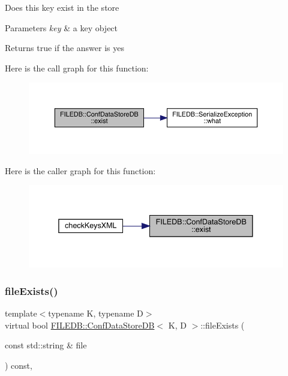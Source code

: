 Does this key exist in the store 
\begin{DoxyParams}{Parameters}
{\em key} & a key object \\
\hline
\end{DoxyParams}
\begin{DoxyReturn}{Returns}
true if the answer is yes 
\end{DoxyReturn}
Here is the call graph for this function\+:
\nopagebreak
\begin{figure}[H]
\begin{center}
\leavevmode
\includegraphics[width=350pt]{d8/d19/classFILEDB_1_1ConfDataStoreDB_afedf2b2ec0b10469cebb72397b02459d_cgraph}
\end{center}
\end{figure}
Here is the caller graph for this function\+:\nopagebreak
\begin{figure}[H]
\begin{center}
\leavevmode
\includegraphics[width=338pt]{d8/d19/classFILEDB_1_1ConfDataStoreDB_afedf2b2ec0b10469cebb72397b02459d_icgraph}
\end{center}
\end{figure}
\mbox{\label{classFILEDB_1_1ConfDataStoreDB_aec1d15aa66421b99e7cd1151e12d2f17}} 
\subsubsection{\texorpdfstring{fileExists()}{fileExists()}\hspace{0.1cm}{\footnotesize\ttfamily [1/2]}}
{\footnotesize\ttfamily template$<$typename K, typename D$>$ \\
virtual bool \mbox{\hyperlink{classFILEDB_1_1ConfDataStoreDB}{F\+I\+L\+E\+D\+B\+::\+Conf\+Data\+Store\+DB}}$<$ K, D $>$\+::file\+Exists (\begin{DoxyParamCaption}\item[{const std\+::string \&}]{file }\end{DoxyParamCaption}) const\hspace{0.3cm}{\ttfamily [inline]}, {\ttfamily [virtual]}}

